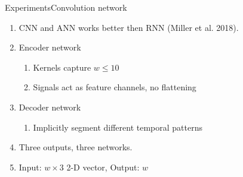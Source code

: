 \documentclass[handout]{beamer}
\begin{document}
%

\begin{frame}{Experiments}{Convolution network}
  \begin{enumerate}
    \item CNN and ANN works better then RNN (Miller et al. 2018).
    \item Encoder network
    \begin{enumerate}
      \item Kernels capture $w\leq10$
      \item Signals act as feature channels, no flattening
    \end{enumerate}
    \item Decoder network
    \begin{enumerate}
      \item Implicitly segment different temporal patterns
    \end{enumerate}
    \item Three outputs, three networks.
    \item Input: $w\times3$ 2-D vector, Output: $w$
  \end{enumerate}
\end{frame}
\end{document}
